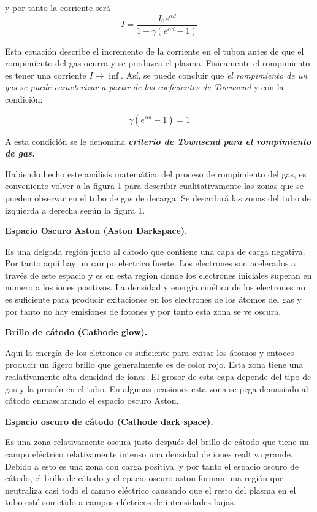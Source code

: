\documentclass[letterpaper,12pt]{article}
\begin{document}
y por tanto la corriente será $$I=\frac{I_0e^{\alpha d}}{1-\gamma (e^{\alpha d }-1)}$$

Esta ecuación describe el incremento de la corriente en el tubon antes de que el rompimiento del gas ocurra y se produzca el plasma. Fisicamente el rompimiento es tener una corriente $I\rightarrow \inf$. Así, se puede concluir 	que \textit{el rompimiento de un gas se puede caracterizar a partir de los coeficientes de Townsend} y con la condición:

$$\gamma(e^{\alpha d}-1)=1 $$

A esta condición se le denomina \textbf{\textit{criterio de Townsend para el rompimiento de gas.}}

Habiendo hecho este análisis matemático del proceso de rompimiento del gas, es conveniente volver a la figura 1 para describir cualitativamente las zonas que se pueden observar en el tubo de gas de decarga. Se describirá las zonas del tubo de izquierda a derecha según la figura 1.

\textbf{Espacio Oscuro Aston (Aston Darkspace).}

Es una delgada región junto al cátodo que contiene una capa de carga negativa. Por tanto aquí hay un campo electrico fuerte. Los electrones son acelerados a través de este espacio y es en esta región  donde los electrones iniciales superan en numero a los iones positivos. La densidad y energía cinética de los electrones no es suficiente para producir exitaciones en los electrones de los  átomos del gas y por tanto no hay emisiones de fotones y por tanto esta zona se ve oscura.

\textbf{Brillo de cátodo (Cathode glow).}

Aqui la energía de los elctrones es suficiente para exitar los átomos y entoces producir un ligero brillo que generalmente es de color rojo. Esta zona tiene una realativamente alta densidad de iones. El grosor de esta capa depende del tipo de gas y la presión en el tubo. En algunas ocasiones esta zona se pega demasiado al cátodo enmascarando el espacio oscuro Aston.

\textbf{Espacio oscuro de cátodo (Cathode dark space).}

Es una zona relativamente oscura justo después del brillo de cátodo que tiene un campo eléctrico relativamente intenso una densidad de iones realtiva grande. Debido a esto es una zona con carga positiva. y por tanto el espacio oscuro de cátodo, el brillo de cátodo y el epacio oscuro aston forman una región que neutraliza casi todo el campo eléctrico causando que el resto del plasma en el tubo esté sometido a campos eléctricos de intensidades bajas.
\end{document}
